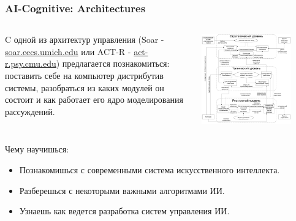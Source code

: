 \documentclass[default]{beamer}
\begin{document}
	\begin{frame}
		\frametitle{AI-Cognitive: Architectures}
		
		\begin{columns}
			\begin{column}{0.5\textwidth}
				C одной из архитектур управления (Soar - \url{soar.eecs.umich.edu} или ACT-R - \url{act-r.psy.cmu.edu}) предлагается познакомиться: поставить себе на компьютер дистрибутив системы, разобраться из каких модулей он состоит и как работает его ядро моделирования рассуждений.
			\end{column}
			\begin{column}{0.5\textwidth}
				\centering
				\includegraphics[width=0.8\textwidth]{agent-schemas/ru/architecture}
			\end{column}
		\end{columns}
		\par\bigskip
		Чему научишься:
		\begin{itemize}
			\item Познакомишься с современными система искусственного интеллекта.
			\item Разберешься с некоторыми важными алгоритмами ИИ.
			\item Узнаешь как ведется разработка систем управления ИИ.
		\end{itemize}
	\end{frame}
\end{document}
